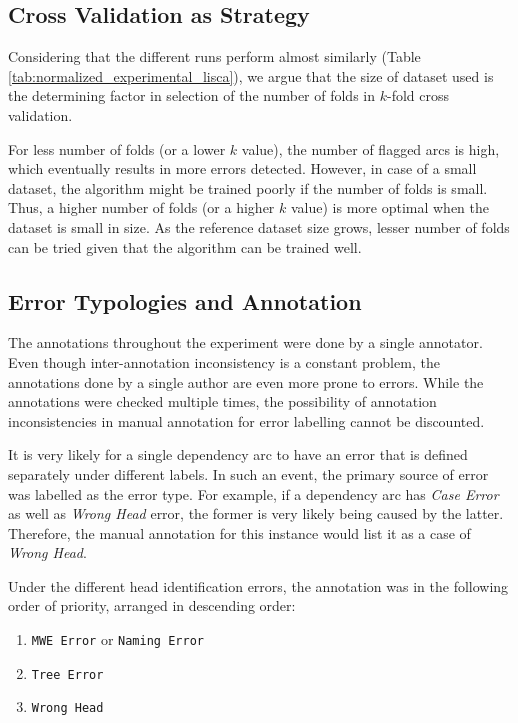 \subsection{Cross Validation as Strategy}

Considering that the different runs perform almost similarly (Table \ref{tab:normalized_experimental_lisca}), we argue that the size of dataset used is the determining factor in selection of the number of folds in \(k\)-fold cross validation.

For less number of folds (or a lower \(k\) value), the number of flagged arcs is high, which eventually results in more errors detected. However, in case of a small dataset, the algorithm might be trained poorly if the number of folds is small. Thus, a higher number of folds (or a higher \(k\) value) is more optimal when the dataset is small in size. As the reference dataset size grows, lesser number of folds can be tried given that the algorithm can be trained well.

\subsection{Error Typologies and Annotation}

The annotations throughout the experiment were done by a single annotator. Even though inter-annotation inconsistency is a constant problem, the annotations done by a single author are even more prone to errors. While the annotations were checked multiple times, the possibility of annotation inconsistencies in manual annotation for error labelling cannot be discounted.

It is very likely for a single dependency arc to have an error that is defined separately under different labels. In such an event, the primary source of error was labelled as the error type. For example, if a dependency arc has \textit{Case Error} as well as \textit{Wrong Head} error, the former is very likely being caused by the latter. Therefore, the manual annotation for this instance would list it as a case of \textit{Wrong Head}.

Under the different head identification errors, the annotation was in the following order of priority, arranged in descending order:

\begin{enumerate}
    \item \texttt{MWE Error} or \texttt{Naming Error}
    \item \texttt{Tree Error}
    \item \texttt{Wrong Head}
\end{enumerate}

